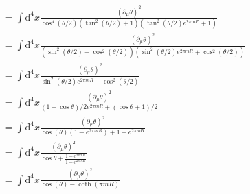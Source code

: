 \documentclass[master,       %
               twoside,        %
               BCOR10mm,       %
               english,ngerman, %
               ]{GAUBM}
\begin{document}
\begin{otherlanguage}{english}
\begin{align}
	 &= \int \mathrm{d}^4 x \frac{(\partial_\mu \theta)^2}{\cos^4(\theta/2)(\tan^2(\theta / 2) + 1)(\tan^2(\theta / 2) e^{2\pi m R} + 1)} \nonumber \\
	 &= \int \mathrm{d}^4 x \frac{(\partial_\mu \theta)^2}{(\sin^2(\theta / 2) + \cos^2(\theta/2))(\sin^2(\theta / 2) e^{2\pi m R} + \cos^2(\theta / 2))} \nonumber \\
	 &= \int \mathrm{d}^4 x \frac{(\partial_\mu \theta)^2}{\sin^2(\theta / 2) e^{2\pi m R} + \cos^2(\theta / 2)} \nonumber \\
	 &= \int \mathrm{d}^4 x \frac{(\partial_\mu \theta)^2}{(1 - \cos \theta) / 2 e^{2\pi m R} + (\cos \theta + 1) / 2} \nonumber \\
	 &= \int \mathrm{d}^4 x \frac{(\partial_\mu \theta)^2}{\cos(\theta)(1 - e^{2\pi mR}) + 1 + e^{2\pi mR}} \nonumber \\
	 &= \int \mathrm{d}^4 x \frac{(\partial_\mu \theta)^2}{\cos \theta + \frac{1 + e^{2\pi mR}}{1 - e^{2\pi mR}}} \nonumber \\
	 &= \int \mathrm{d}^4 x \frac{(\partial_\mu \theta)^2}{\cos(\theta) - \coth(\pi mR)}
\end{align}


\end{otherlanguage}
\end{document}
